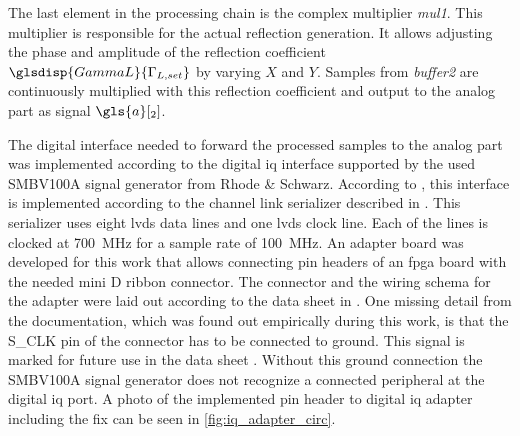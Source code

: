 \documentclass[12pt,a4paper,parskip=full,abstract=true,BCOR=12mm,twoside,open=right]{scrreprt}
\def\device#1{\textit{#1}}
\begin{document}
The last element in the processing chain is the complex multiplier \device{mul1}. This
multiplier is responsible for the actual reflection generation. It allows
adjusting the phase and amplitude of the reflection coefficient $\glsdisp{GammaL}{\Gamma_{L,set}}$ by
varying $X$ and $Y$. Samples from \device{buffer2} are continuously multiplied
with this reflection coefficient and output to the analog part as signal $\gls{a}[_2]$.

The digital interface needed to forward the processed samples to the analog part
was implemented according to the digital \gls{iq} interface supported by the used
SMBV100A signal generator from Rhode \& Schwarz. According to \cite{fsq_b17}, this interface is
implemented according to the channel link serializer described in \cite{ds90cr485}. This
serializer uses eight \gls{lvds} data lines and one \gls{lvds} clock line. Each of the lines
is clocked at \SI{700}{\mega\hertz} for a sample rate of \SI{100}{\mega\hertz}. An adapter
board was developed for this work that allows connecting pin headers of an \gls{fpga} board with
the needed mini D ribbon connector\cite{fsq_b17}. The connector and the wiring schema for the adapter
were laid out according to the data sheet in \cite{fsq_b17}. One missing detail from the documentation,
which was found out empirically during this work, is that the S\_CLK pin of the connector
has to be connected to ground. This signal is marked for future use in the data sheet \cite{fsq_b17}.
Without this ground connection the SMBV100A signal generator does not recognize a connected peripheral
at the digital \gls{iq} port. A photo of the implemented pin header to digital \gls{iq} adapter including
the fix can be seen in \cref{fig:iq_adapter_circ}.
\end{document}

